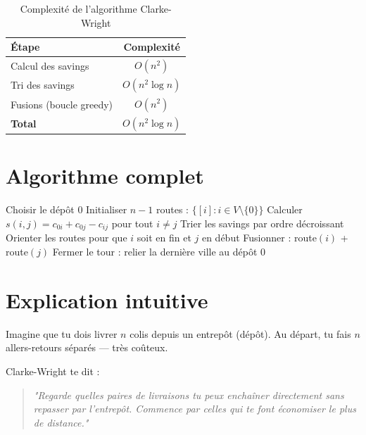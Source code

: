 \documentclass[12pt, a4paper]{article}
\begin{document}
\begin{table}[h]
  \centering
  \begin{tabular}{lc}
    \toprule
    \textbf{Étape} & \textbf{Complexité} \\
    \midrule
    Calcul des savings       & $O(n^2)$ \\
    Tri des savings          & $O(n^2 \log n)$ \\
    Fusions (boucle greedy)  & $O(n^2)$ \\
    \midrule
    \textbf{Total}           & $O(n^2 \log n)$ \\
    \bottomrule
  \end{tabular}
  \caption{Complexité de l'algorithme Clarke-Wright}
\end{table}

\section{Algorithme complet}

\begin{algorithm}[H]
\caption{Clarke-Wright Savings Algorithm}
\begin{algorithmic}[1]
\State Choisir le dépôt $0$
\State Initialiser $n-1$ routes : $\{[i] : i \in V \setminus \{0\}\}$
\State Calculer $s(i,j) = c_{0i} + c_{0j} - c_{ij}$ pour tout $i \neq j$
\State Trier les savings par ordre décroissant
      \State Orienter les routes pour que $i$ soit en fin et $j$ en début
      \State Fusionner : route$(i)$ + route$(j)$
    \EndIf
  \EndIf
\EndFor
\State Fermer le tour : relier la dernière ville au dépôt $0$
\end{algorithmic}
\end{algorithm}

\section{Explication intuitive}

Imagine que tu dois livrer $n$ colis depuis un entrepôt (dépôt).
Au départ, tu fais $n$ allers-retours séparés --- très coûteux.

Clarke-Wright te dit :
\begin{quote}
  \textit{"Regarde quelles paires de livraisons tu peux enchaîner directement
  sans repasser par l'entrepôt. Commence par celles qui te font économiser
  le plus de distance."}
\end{quote}
\end{document}
